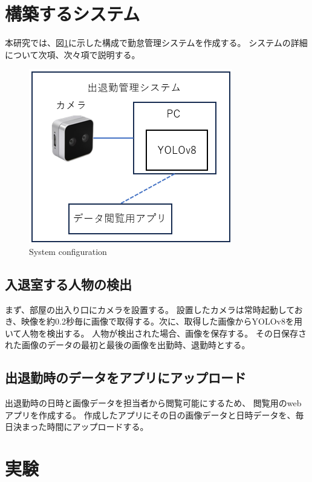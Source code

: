 \documentclass[10pt]{jarticle}
\begin{document}
    \section{構築するシステム}%
本研究では、図\ref{configuration}に示した構成で勤怠管理システムを作成する。
システムの詳細について次項、次々項で説明する。

\begin{figure}[!h]
\centering
\includegraphics[width=0.7\linewidth]{fig/composition.png}
\caption{System configuration}
\label{configuration}
\end{figure}

    \subsection{入退室する人物の検出}
まず、部屋の出入り口にカメラを設置する。
設置したカメラは常時起動しておき、映像を約0.2秒毎に画像で取得する。次に、取得した画像からYOLOv8を用いて人物を検出する。
人物が検出された場合、画像を保存する。
その日保存された画像のデータの最初と最後の画像を出勤時、退勤時とする。

    \subsection{出退勤時のデータをアプリにアップロード}
出退勤時の日時と画像データを担当者から閲覧可能にするため、
閲覧用のwebアプリを作成する。
作成したアプリにその日の画像データと日時データを、毎日決まった時間にアップロードする。


     
    \section{実験}%
\end{document}
